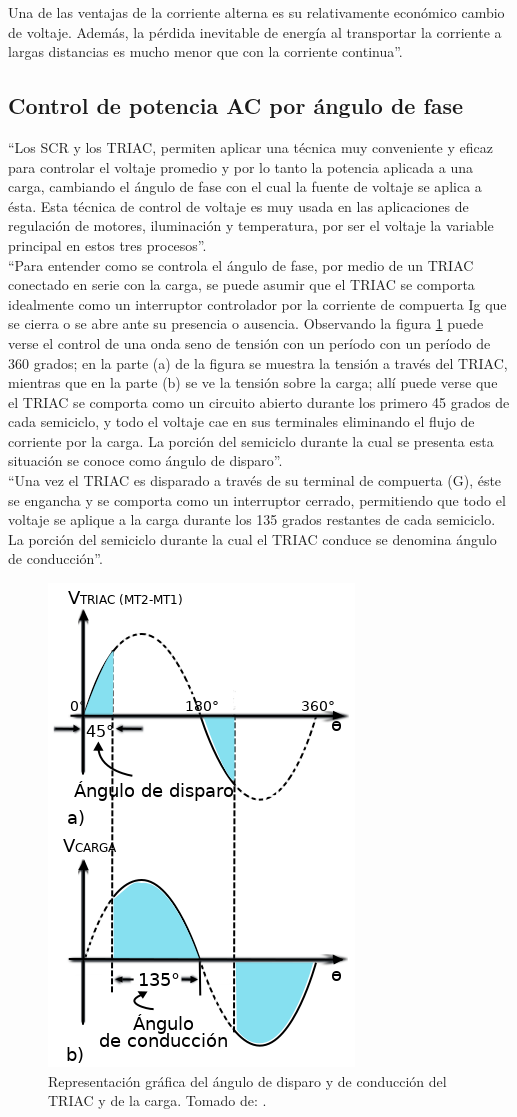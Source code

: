 Una de las ventajas de la corriente alterna es su relativamente económico cambio de voltaje. Además, la pérdida inevitable de energía al transportar la corriente a largas distancias es mucho menor que con la corriente continua''. \cite{Cor}

\subsection{Control de potencia AC por ángulo de fase}

``Los SCR y los TRIAC, permiten aplicar una técnica muy conveniente y eficaz para controlar el voltaje promedio y por lo tanto la potencia aplicada a una carga, cambiando el ángulo de fase con el cual la fuente de voltaje se aplica a ésta. Esta técnica de control de voltaje es muy usada en las aplicaciones de regulación de motores, iluminación y temperatura, por ser el voltaje la variable principal en estos tres procesos''.\cite{CEKIT}\\

``Para entender como se controla el ángulo de fase, por medio de un TRIAC conectado en serie con la carga, se puede asumir que el TRIAC se comporta idealmente como un interruptor controlador por la corriente de compuerta Ig que se cierra o se abre ante su presencia o ausencia. Observando la figura \ref{fig:triacgraph} puede verse el control de una onda seno de tensión con un período con un período de 360 grados; en la parte (a) de la figura se muestra la tensión a través del TRIAC, mientras que en la parte (b) se ve la tensión sobre la carga; allí puede verse que el TRIAC se comporta como un circuito abierto durante los primero 45 grados de cada semiciclo, y todo el voltaje cae en sus terminales eliminando el flujo de corriente por la carga. La porción del semiciclo durante la cual se presenta esta situación se conoce como ángulo de disparo''\cite{CEKIT}.\\

``Una vez el TRIAC es disparado a través de su terminal de compuerta (G), éste se engancha y se comporta como un interruptor cerrado, permitiendo que todo el voltaje se aplique a la carga durante los 135 grados restantes de cada semiciclo. La porción del semiciclo durante la cual el TRIAC conduce se denomina ángulo de conducción''\cite{CEKIT}.

\begin{figure}[H]
	\centering
	\caption{Representación gráfica del ángulo de disparo y de conducción del TRIAC y de la carga. Tomado de: \cite{CEKIT}.}
	\label{fig:triacgraph}
	\includegraphics[width=0.3\linewidth]{Imagenes/TRIAC_graph}
\end{figure}

